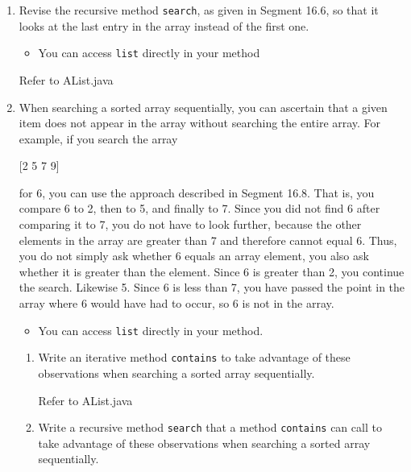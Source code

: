 \documentclass[10pt]{article}
\begin{document}
	\begin{enumerate}
		\item[1.] Revise the recursive method \texttt{search}, as given in Segment 16.6, so that it looks at the last entry in the array instead of the first one.
		
			\begin{itemize}
				\item You can access \texttt{list} directly in your method
			\end{itemize}
			
			\vspace{0.5cm}
			Refer to AList.java
			\vspace{0.5cm}
		
		\item[2.] When searching a sorted array sequentially, you can ascertain that a given item does not appear in the array without searching the entire array. For example, if you search the array
		
		\vspace{0.5cm}
		[2 5 7 9]
		
		\vspace{0.5cm}
		for 6, you can use the approach described in Segment 16.8. That is, you compare 6 to 2, then to 5, and finally to 7. Since you did not find 6 after comparing it to 7, you do not have to look further, because the other elements in the array are greater than 7 and therefore cannot equal 6. Thus, you do not simply ask whether 6 equals an array element, you also ask whether it is greater than the element. Since 6 is greater than 2, you continue the search. Likewise 5. Since 6 is less than 7, you have passed the point in the array where 6 would have had to occur, so 6 is not in the array.
		
			\begin{itemize}
				\item You can access \texttt{list} directly in your method.			
			\end{itemize}
			
			\begin{enumerate}
				\item Write an iterative method \texttt{contains} to take advantage of these observations when searching a sorted array sequentially.
					
					\vspace{0.5cm}
					Refer to AList.java
					\vspace{0.5cm}
				
				\item Write a recursive method \texttt{search} that a method \texttt{contains} can call to take advantage of these observations when searching a sorted array sequentially.
					

\end{enumerate}
\end{enumerate}
\end{document}
